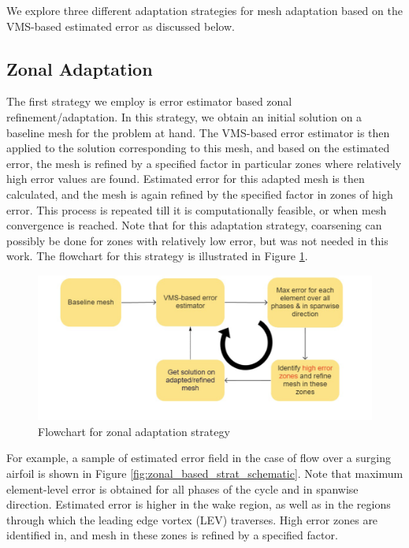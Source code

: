 We explore three different adaptation strategies for mesh adaptation based on the VMS-based estimated error as discussed below. 

\subsection{Zonal Adaptation}



The first strategy we employ is error estimator based zonal refinement/adaptation. 
In this strategy, we obtain an initial solution on a baseline mesh for the problem at hand. The VMS-based error estimator is then applied to the solution corresponding to this mesh, and based on the estimated error, the mesh is refined by a specified factor in particular zones where relatively high error values are found. Estimated error for this adapted mesh is then calculated, and the mesh is again refined by the specified factor in zones of high error. This process is repeated till it is computationally feasible, or when mesh convergence is reached.
Note that for this adaptation strategy, coarsening can possibly be done for zones with relatively low error, but was not needed in this work. The flowchart for this strategy is illustrated in Figure \ref{fig:zonal_based_strat}.

\begin{figure}[H]
	\centering
	\includegraphics[width=1\textwidth]{figures/adapt_strat/zonal_based.png}
	\caption{Flowchart for zonal adaptation strategy}
	\label{fig:zonal_based_strat}
\end{figure}

For example, a sample of estimated error field in the case of flow over a surging airfoil is shown in Figure \ref{fig:zonal_based_strat_schematic}.
Note that maximum element-level error is obtained for all phases of the cycle and in spanwise direction.
Estimated error is higher in the wake region, as well as in the regions through which the leading edge vortex (LEV) traverses.
High error zones are identified in, and mesh in these zones is refined by a specified factor.


